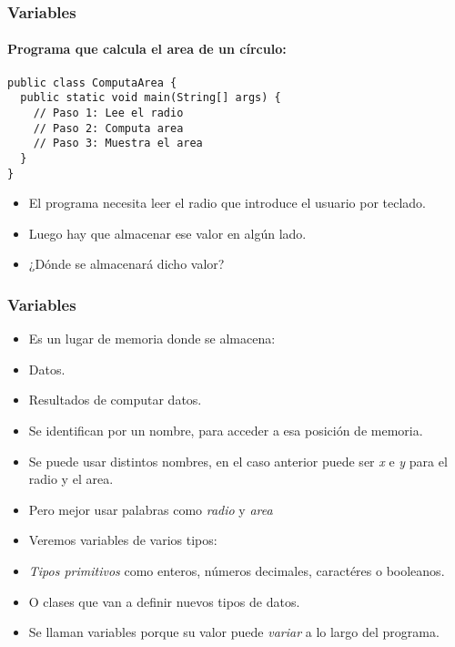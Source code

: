 \documentclass{beamer}
\begin{document}
\begin{frame}[fragile]
    \frametitle{Variables}
    \framesubtitle{Programa que calcula el area de un círculo:}
    \begin{verbatim}
public class ComputaArea {
  public static void main(String[] args) {
    // Paso 1: Lee el radio
    // Paso 2: Computa area 
    // Paso 3: Muestra el area
  }
}
\end{verbatim}
\pause
\begin{itemize}[<+-| alert@+>]
      \item El programa necesita leer el radio que introduce el usuario por teclado.
      \item Luego hay que almacenar ese valor en algún lado.
	\item ¿Dónde se almacenará dicho valor?
\end{itemize}
\pause
\end{frame}
\begin{frame}
    \frametitle{Variables}

\begin{itemize}[<+-| alert@+>]
      \item Es un lugar de memoria donde se almacena:
      \item Datos.
      \item Resultados de computar datos.
      \item Se identifican por un nombre, para acceder a esa posición de memoria.
      \item Se puede usar distintos nombres, en el caso anterior puede ser \emph{x} e \emph{y} para el radio y el area.
      \item Pero mejor usar palabras como \emph{radio} y \emph{area}
      \item Veremos variables de varios tipos:
      \item \emph{Tipos primitivos} como enteros, números decimales, caractéres o booleanos.
      \item O clases que van a definir nuevos tipos de datos.    
      \item Se llaman variables porque su valor puede \emph{variar} a lo largo del programa.
    \end{itemize}
    \pause

\end{frame}
\end{document}

